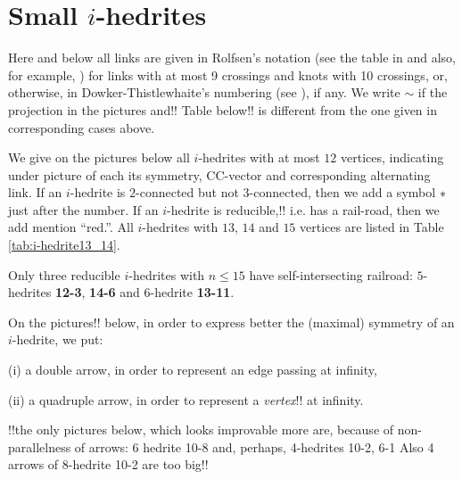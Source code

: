 \documentclass[12pt]{article}
\begin{document}





\section{Small $i$-hedrites}

Here and below all links are given 
in Rolfsen's notation (see the table in \cite{Rolf} and also,  
for example, \cite{Kaw}) for links with at most 9 
crossings and knots with 10 crossings, or, otherwise, in
Dowker-Thistlewhaite's numbering (see \cite{T}), if any.
We write $\sim$ if the projection in the pictures and!! Table below!! is different 
from the one given in corresponding cases above.

We give on the pictures below all $i$-hedrites with at most $12$ vertices,
indicating under 
picture of each its symmetry, CC-vector and corresponding alternating link.
If an $i$-hedrite is $2$-connected but not $3$-connected, then we add
a symbol ${\bf *}$ just after the number. If an $i$-hedrite is reducible,!! 
i.e. has a rail-road, then we add mention ``red.''. All $i$-hedrites
with $13$, $14$ and $15$ vertices are listed in Table
\ref{tab:i-hedrite13_14}.

Only three reducible $i$-hedrites with $n \leq 15$ have self-intersecting
railroad: $5$-hedrites {\bf 12-3}, {\bf 14-6} and $6$-hedrite {\bf 13-11}.


On the pictures!! below, in order to express better the (maximal)
symmetry of an $i$-hedrite, we put:

(i) a double arrow, in order to represent an edge passing at infinity,

(ii) a quadruple arrow, in order to represent a {\em vertex}!!
 at infinity.

!!the only pictures below, which looks improvable more are, because of 
non-parallelness of arrows: 6 hedrite 10-8 and, perhaps, 4-hedrites 10-2, 6-1
Also 4 arrows of 8-hedrite 10-2 are too big!!
\end{document}
